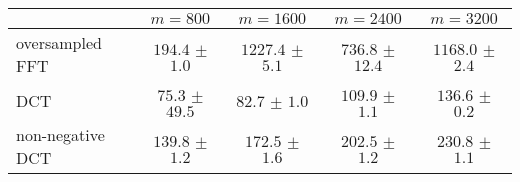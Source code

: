 \centering
\renewcommand{\arraystretch}{1.2}
\begin{tabular}{@{}lcccc@{}}
\toprule
 & $m=800$ & $m=1600$ & $m=2400$ & $m=3200$\\
\midrule
oversampled FFT & $194.4$ $\pm$ $1.0$ & $1227.4$ $\pm$ $5.1$ & $736.8$ $\pm$ $12.4$ & $1168.0$ $\pm$ $2.4$ \\
DCT & $75.3$ $\pm$ $49.5$ & $82.7$ $\pm$ $1.0$ & $109.9$ $\pm$ $1.1$ & $136.6$ $\pm$ $0.2$ \\
non-negative DCT & $139.8$ $\pm$ $1.2$ & $172.5$ $\pm$ $1.6$ & $202.5$ $\pm$ $1.2$ & $230.8$ $\pm$ $1.1$ \\
\bottomrule
\end{tabular}
